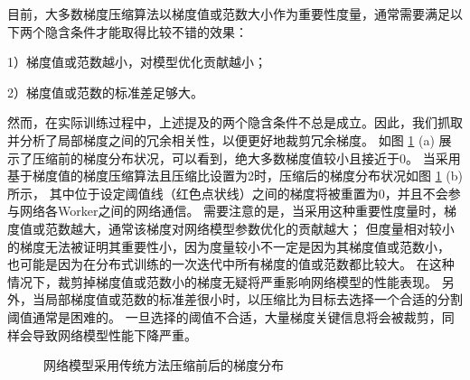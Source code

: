 \documentclass{xdupgthesis}
\begin{document}
目前，大多数梯度压缩算法以梯度值或范数大小作为重要性度量，通常需要满足以下两个隐含条件才能取得比较不错的效果：

1）梯度值或范数越小，对模型优化贡献越小；

2）梯度值或范数的标准差足够大。

然而，在实际训练过程中，上述提及的两个隐含条件不总是成立。因此，我们抓取并分析了局部梯度之间的冗余相关性，以便更好地裁剪冗余梯度。
如图 \ref{fig_Gradient-Distribution-1} (a) 展示了压缩前的梯度分布状况，可以看到，绝大多数梯度值较小且接近于0。
当采用基于梯度值的梯度压缩算法且压缩比设置为2时，压缩后的梯度分布状况如图 \ref{fig_Gradient-Distribution-1} (b) 所示，
其中位于设定阈值线（红色点状线）之间的梯度将被重置为0，并且不会参与网络各Worker之间的网络通信。
需要注意的是，当采用这种重要性度量时，梯度值或范数越大，通常该梯度对网络模型参数优化的贡献越大；
但度量相对较小的梯度无法被证明其重要性小，因为度量较小不一定是因为其梯度值或范数小，
也可能是因为在分布式训练的一次迭代中所有梯度的值或范数都比较大。
在这种情况下，裁剪掉梯度值或范数小的梯度无疑将严重影响网络模型的性能表现。
另外，当局部梯度值或范数的标准差很小时，以压缩比为目标去选择一个合适的分割阈值通常是困难的。
一旦选择的阈值不合适，大量梯度关键信息将会被裁剪，同样会导致网络模型性能下降严重。

\begin{figure}[t]
    \centering
    \caption{网络模型采用传统方法压缩前后的梯度分布}
    \label{fig_Gradient-Distribution-1}
\end{figure}
\end{document}
